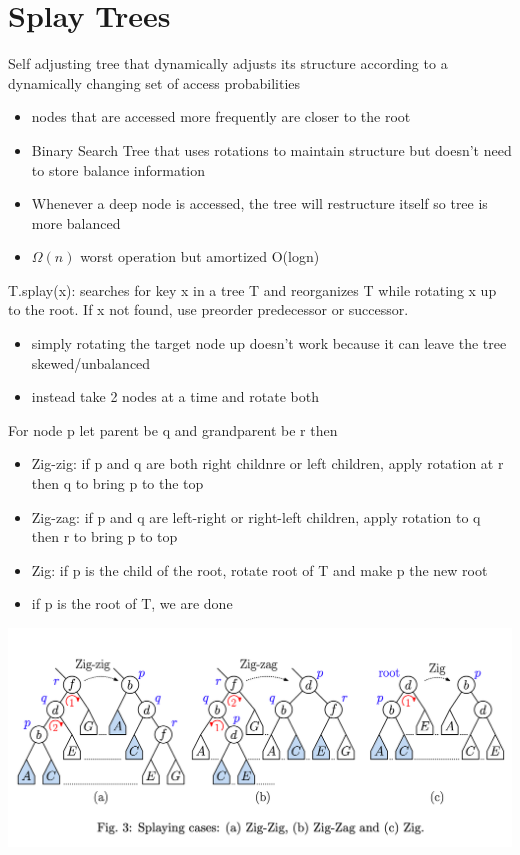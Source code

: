 \documentclass{article}
\begin{document}
  \section{Splay Trees}
  Self adjusting tree that dynamically adjusts its structure according to a dynamically changing set of access probabilities
  \begin{itemize}[noitemsep]
  \item nodes that are accessed more frequently are closer to the root
  \item Binary Search Tree that uses rotations to maintain structure but doesn't need to store balance information
  \item Whenever a deep node is accessed, the tree will restructure itself so tree is more balanced 
  \item $\Omega(n)$ worst operation but amortized O(logn) \\
  \end{itemize}
  T.splay(x): searches for key x in a tree T and reorganizes T while rotating x up to the root. If x not found, use preorder predecessor or successor.
  \begin{itemize}[noitemsep]
  \item simply rotating the target node up doesn't work because it can leave the tree skewed/unbalanced
  \item instead take 2 nodes at a time and rotate both
  \end{itemize}
  For node p let parent be q and grandparent be r then
  \begin{itemize}[noitemsep]
  \item Zig-zig: if p and q are both right childnre or left children, apply rotation at r then q to bring p to the top
  \item Zig-zag: if p and q are left-right or right-left children, apply rotation to q then r to bring p to top 
  \item Zig: if p is the child of the root, rotate root of T and make p the new root
  \item if p is the root of T, we are done
  \end{itemize}
  \includegraphics[width=\textwidth]{SplayTreeZig}
\end{document}
